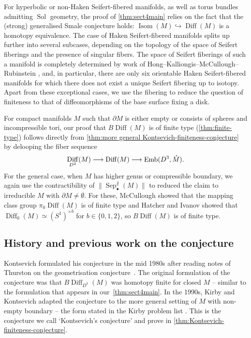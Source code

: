 \documentclass{amsart}
\theoremstyle{plain}
\theoremstyle{definition}
\DeclareMathOperator\Diff{Diff}
\DeclareMathOperator\Isom{Isom}
\DeclareMathOperator\emb{Emb}
\DeclareMathOperator\Sol{Sol}
\newcommand{\interior}[1]{\smash{\mathring{#1}}}
\DeclareMathOperator\sep{Sep} %
\newcommand{\sepNP}{\sep^{\nparallel}} %
\newcommand{\BDiff}{B\!\Diff}
\begin{document}
For hyperbolic or non-Haken Seifert-fibered manifolds, as well as  torus bundles admitting $\Sol$ geometry, the proof of \cref{thm:sect4main} relies on the fact that the (strong) generalised Smale conjecture holds: $\Isom(M)\hookrightarrow \Diff(M)$ is a homotopy equivalence. 
The case of Haken Seifert-fibered manifolds splits up further into several subcases, depending on the 
topology of the space of Seifert fiberings and the presence of singular fibers. The space of Seifert fiberings of such a manifold is completely determined by work of Hong--Kalliongis--McCullough--Rubinstein \cite{HKMR12}, and, in particular,  there are only six orientable Haken Seifert-fibered manifolds for which there does not exist a unique Seifert fibering up to isotopy. Apart from these exceptional cases, we  use the fibering to reduce the question of finiteness to that of diffeomorphisms of the base surface fixing a disk. 

For compact manifolds $M$ such that $\partial M$ is either empty or consists of spheres and incompressible tori, our proof that $\BDiff(M)$ is of finite type (\cref{thm:finite-type}) follows directly from \cref{thm:more general Kontsevich-finiteness-conjecture} by delooping the fiber sequence
\[
     \Diff_{D^3}(M)\longrightarrow
    \Diff(M) \longrightarrow
    \emb(D^3, \interior{M}).
\]
For the general case, when $M$ has higher genus or compressible boundary, we again use the contractibility of $\|\sepNP_\bullet(M)\|$ to reduced the claim to irreducible $M$ with $\partial M \neq \emptyset$.
For these, McCullough \cite{McCullough1991} showed that the mapping class group $\pi_0\Diff(M)$ is of finite type and Hatcher and Ivanov \cite{Hatcher76, Ivanov76} showed that $\Diff_0(M) \simeq (S^1)^{\times b}$ for $b\in \{0,1,2\}$, so $\BDiff(M)$ is of finite type.
 

\subsection{History and previous work on the conjecture}
 Kontsevich formulated his conjecture in the mid 1980s after reading notes of Thurston on the geometrisation conjecture~\cite{KontsevichCorrespondence2024}. 
 The original formulation of the conjecture was that $\BDiff_{D^3}(M)$ was homotopy finite for closed $M$ -- similar to the formulation that appears in our~\cref{thm:sect4main}. 
 In the 1990s, Kirby and Kontsevich adapted the conjecture to the more general setting of $M$ with non-empty boundary -- the form stated in the Kirby problem list \cite[Problem 3.48]{KirbyProblems}. This is the conjecture we call `Kontsevich's conjecture' and prove in \cref{thm:Kontsevich-finiteness-conjecture}.
 
\end{document}
